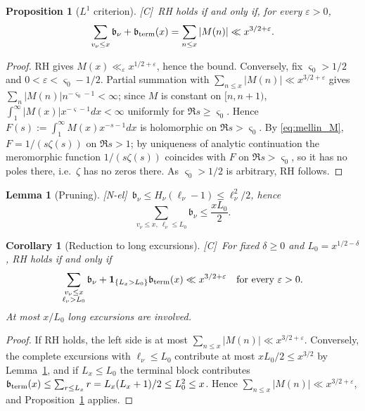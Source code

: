 \documentclass[11pt]{amsart}
\numberwithin{equation}{section}
\theoremstyle{plain}
\newtheorem{proposition}[theorem]{Proposition}
\newtheorem{lemma}[theorem]{Lemma}
\newtheorem{corollary}[theorem]{Corollary}
\theoremstyle{definition}
\theoremstyle{remark}
\newcommand{\eps}{\varepsilon}
\newcommand{\tagNE}{\textup{[N-el]}}
\newcommand{\tagC}{\textup{[C]}}
\begin{document}
\begin{proposition}[$L^1$ criterion]
\label{prop:L1}
\tagC\ RH holds if and only if, for every $\eps>0$,
\begin{equation}
\label{eq:L1_criterion}
  \sum_{v_\nu\le x}\mathfrak b_\nu+\mathfrak b_{\rm term}(x)=\sum_{n\le x}|M(n)|
  \ll x^{3/2+\eps}.
\end{equation}
\end{proposition}

\begin{proof}
RH gives $M(x)\ll_\eps x^{1/2+\eps}$, hence the bound. Conversely, fix
$\varsigma_0>1/2$ and $0<\eps<\varsigma_0-1/2$. Partial summation with
$\sum_{n\le x}|M(n)|\ll x^{3/2+\eps}$ gives
$\sum_n|M(n)|n^{-\varsigma_0-1}<\infty$; since $M$ is constant on
$[n,n+1)$, $\int_1^\infty|M(x)|x^{-\varsigma-1}dx<\infty$ uniformly for
$\Re s\ge\varsigma_0$. Hence $F(s):=\int_1^\infty M(x)x^{-s-1}dx$ is
holomorphic on $\Re s>\varsigma_0$. By \eqref{eq:mellin_M}, $F=1/(s\zeta(s))$
on $\Re s>1$; by uniqueness of analytic continuation the meromorphic function
$1/(s\zeta(s))$ coincides with $F$ on $\Re s>\varsigma_0$, so it has no poles
there, i.e.\ $\zeta$ has no zeros there. As $\varsigma_0>1/2$ is arbitrary,
RH follows.
\end{proof}

\begin{lemma}[Pruning]
\label{lem:pruning}
\tagNE\ $\mathfrak b_\nu\le H_\nu(\ell_\nu-1)\le\ell_\nu^2/2$, hence
\begin{equation}
\label{eq:pruning}
  \sum_{v_\nu\le x,\ \ell_\nu\le L_0}\mathfrak b_\nu\le\frac{xL_0}{2}.
\end{equation}
\end{lemma}

\begin{corollary}[Reduction to long excursions]
\label{cor:long}
\tagC\ For fixed $\delta\ge0$ and $L_0=x^{1/2-\delta}$, RH holds if and only if
\begin{equation}
\label{eq:long_reduction}
  \sum_{\substack{v_\nu\le x\\ \ell_\nu>L_0}}\mathfrak b_\nu
  +\mathbf 1_{\{L_x>L_0\}}\mathfrak b_{\rm term}(x)\ll x^{3/2+\eps}
  \quad\text{for every }\eps>0.
\end{equation}
At most $x/L_0$ long excursions are involved.
\end{corollary}

\begin{proof}
If RH holds, the left side is at most $\sum_{n\le x}|M(n)|\ll x^{3/2+\eps}$.
Conversely, the complete excursions with $\ell_\nu\le L_0$ contribute at
most $xL_0/2\le x^{3/2}$ by Lemma~\ref{lem:pruning}, and if $L_x\le L_0$
the terminal block contributes
$\mathfrak b_{\rm term}(x)\le\sum_{r\le L_x}r=L_x(L_x+1)/2\le L_0^2\le x$.
Hence $\sum_{n\le x}|M(n)|\ll x^{3/2+\eps}$, and
Proposition~\ref{prop:L1} applies.
\end{proof}
\end{document}
